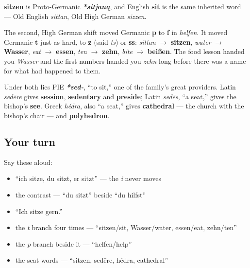 \begin{cousinweb}
\textbf{sitzen} is Proto-Germanic \emph{\textbf{*sitjaną}}, and English \textbf{sit} is the same inherited word — Old English \emph{sittan}, Old High German \emph{sizzen}.

The second, High German shift moved Germanic \textbf{p} to \textbf{f} in \emph{helfen}. It moved Germanic \textbf{t} just as hard, to \textbf{z} (said \emph{ts}) or \textbf{ss}: \emph{sittan} $\to$ \textbf{sitzen}, \emph{water} $\to$ \textbf{Wasser}, \emph{eat} $\to$ \textbf{essen}, \emph{ten} $\to$ \textbf{zehn}, \emph{bite} $\to$ \textbf{beißen}. The food lesson handed you \emph{Wasser} and the first numbers handed you \emph{zehn} long before there was a name for what had happened to them.

Under both lies PIE \emph{\textbf{*sed-}}, \textquotedblleft{}to sit,\textquotedblright{} one of the family's great providers. Latin \emph{sedēre} gives \textbf{session}, \textbf{sedentary} and \textbf{preside}; Latin \emph{sedēs}, \textquotedblleft{}a seat,\textquotedblright{} gives the bishop's \textbf{see}. Greek \emph{hédra}, also \textquotedblleft{}a seat,\textquotedblright{} gives \textbf{cathedral} — the church with the bishop's chair — and \textbf{polyhedron}.
\end{cousinweb}

\subsection*{Your turn}
Say these aloud:

\begin{itemize}
\raggedright
  \item \textquotedblleft{}ich sitze, du sitzt, er sitzt\textquotedblright{} — the \emph{i} never moves
  \item the contrast — \textquotedblleft{}du sitzt\textquotedblright{} beside \textquotedblleft{}du hilfst\textquotedblright{}
  \item \textquotedblleft{}Ich sitze gern.\textquotedblright{}
  \item the \emph{t} branch four times — \textquotedblleft{}sitzen/sit, Wasser/water, essen/eat, zehn/ten\textquotedblright{}
  \item the \emph{p} branch beside it — \textquotedblleft{}helfen/help\textquotedblright{}
  \item the seat words — \textquotedblleft{}sitzen, sedēre, hédra, cathedral\textquotedblright{}
\end{itemize}

